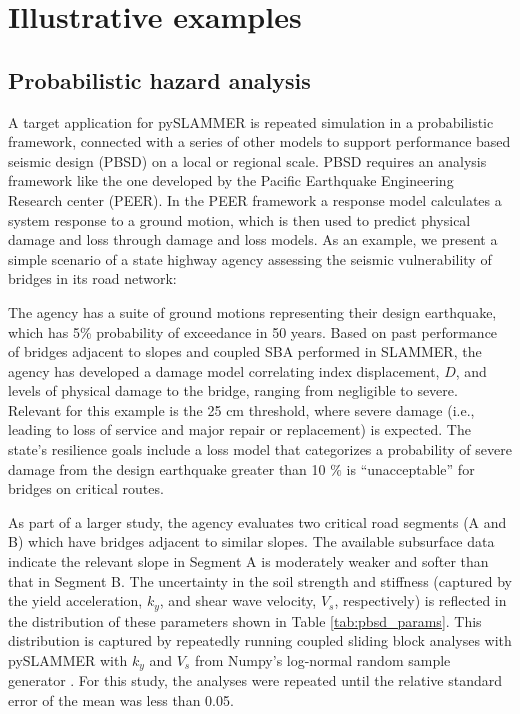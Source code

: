 \documentclass[preprint,review,12pt]{elsarticle}
\begin{document}
\section{Illustrative examples}\label{sec:examples}

\subsection{Probabilistic hazard analysis}
A target application for pySLAMMER is repeated simulation in a probabilistic framework, connected with a series of other models to support performance based seismic design (PBSD) on a local or regional scale.
PBSD requires an analysis framework like the one developed by the Pacific Earthquake Engineering Research center (PEER).
In the PEER framework a response model calculates a system response to a ground motion, which is then used to predict physical damage and loss through damage and loss models. 
As an example, we present a simple scenario of a state highway agency assessing the seismic vulnerability of bridges in its road network:


The agency has a suite of ground motions representing their design earthquake, which has 5\% probability of exceedance in 50 years.
Based on past performance of bridges adjacent to slopes and coupled SBA performed in SLAMMER, the agency has developed a damage model correlating index displacement, $D$,  and levels of physical damage to the bridge, ranging from negligible to severe.
Relevant for this example is the 25 cm threshold, where severe damage (i.e., leading to loss of service and major repair or replacement) is expected.
The state's resilience goals include a loss model that categorizes a probability of severe damage from the design earthquake greater than 10 $\%$ is ``unacceptable'' for bridges on critical routes.

As part of a larger study, the agency evaluates two critical road segments (A and B) which have bridges adjacent to similar slopes.
The available subsurface data indicate the relevant slope in Segment A is moderately weaker and softer than that in Segment B.
The uncertainty in the soil strength and stiffness (captured by the yield acceleration, $k_y$, and shear wave velocity, $V_s$, respectively) is reflected in the distribution of these parameters shown in Table \ref{tab:pbsd_params}.
This distribution is captured by repeatedly running coupled sliding block analyses with pySLAMMER with $k_y$ and $V_s$ from Numpy's log-normal random sample generator \cite{harris_array_2020}.
For this study, the analyses were repeated until the relative standard error of the mean was less than 0.05.
\end{document}
